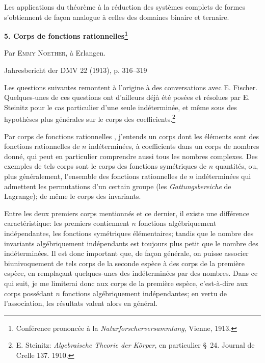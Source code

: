 \documentclass[11pt]{article}
\begin{document}
Les applications du théorème à la réduction des systèmes complets de formes s'obtiennent de façon analogue à celles des domaines binaire et ternaire.

\clearpage
\setcounter{footnote}{0}

\begin{center}
{\Large\bfseries 5. Corps de fonctions rationnelles\footnote{Conférence prononcée à la \emph{Naturforscherversammlung}, Vienne, 1913.}}\par
\vspace{1.2em}
Par \textsc{Emmy Noether}, à Erlangen.\par
\medskip
Jahresbericht der DMV 22 (1913), p. 316--319
\end{center}

\vspace{2em}

Les questions suivantes remontent à l'origine à des conversations avec E. Fischer. Quelques-unes de ces questions ont d'ailleurs déjà été posées et résolues par E. Steinitz pour le cas particulier d'une seule indéterminée, et même sous des hypothèses plus générales sur le corps des coefficients.\footnote{E. Steinitz: \emph{Algebraische Theorie der Körper}, en particulier \S\ 24. Journal de Crelle 137. 1910.}

Par \og corps de fonctions rationnelles \fg{}, j'entends un corps dont les éléments sont des fonctions rationnelles de $n$ indéterminées, à coefficients dans un corps de nombres donné, qui peut en particulier comprendre aussi tous les nombres complexes. Des exemples de tels corps sont le corps des fonctions symétriques de $n$ quantités, ou, plus généralement, l'ensemble des fonctions rationnelles de $n$ indéterminées qui admettent les permutations d'un certain groupe (les \emph{Gattungsbereiche} de Lagrange); de même le corps des invariants.

Entre les deux premiers corps mentionnés et ce dernier, il existe une différence caractéristique: les premiers contiennent $n$ fonctions algébriquement indépendantes, les fonctions symétriques élémentaires; tandis que le nombre des invariants algébriquement indépendants est toujours plus petit que le nombre des indéterminées. Il est donc important que, de façon générale, on puisse associer biunivoquement de tels corps de la seconde espèce à des corps de la première espèce, en remplaçant quelques-unes des indéterminées par des nombres. Dans ce qui suit, je me limiterai donc aux corps de la première espèce, c'est-à-dire aux corps possédant $n$ fonctions algébriquement indépendantes; en vertu de l'association, les résultats valent alors en général.
\end{document}
